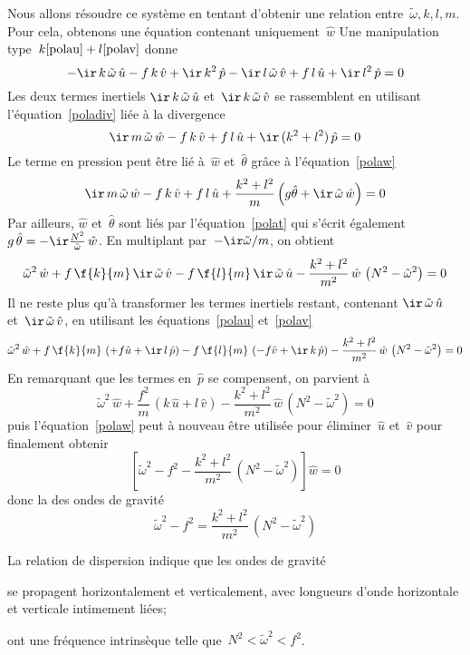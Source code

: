 \sk
Nous allons résoudre ce système 
en tentant d'obtenir une relation entre~$\tilde{\omega},k,l,m$.
Pour cela, obtenons une équation contenant uniquement~$\hat{w}$
Une manipulation type~$k \ref{polau} + l \ref{polav}$ donne
\[
- \ir \, k \, \tilde{\omega} \, \hat{u}
- f \, k \, \hat{v}
+ \ir \, k^2 \, \hat{p} 
- \ir \, l \, \tilde{\omega} \, \hat{v}
+ f \, l \, \hat{u}
+ \ir \, l^2 \, \hat{p} 
= 0
\]
\noindent Les deux termes inertiels $\ir \, k \, \tilde{\omega} \, \hat{u}$ et~$\ir \, k \, \tilde{\omega} \, \hat{v}$ 
se rassemblent en utilisant l'équation~\ref{poladiv} liée à la divergence
\[
\ir \, m \, \tilde{\omega} \, \hat{w}
- f \, k \, \hat{v}
+ f \, l \, \hat{u}
+ \ir \, (k^2 + l^2) \, \hat{p}
= 0
\]
\noindent Le terme en pression peut être lié à~$\hat{w}$ et~$\hat{\theta}$ grâce à l'équation~\ref{polaw}
\[
\ir \, m \, \tilde{\omega} \, \hat{w}
- f \, k \, \hat{v}
+ f \, l \, \hat{u}
+ \frac{k^2 + l^2}{m} \left( g \hat{\theta} + \ir \, \tilde{\omega} \, \hat{w} \right)
= 0
\]
\noindent Par ailleurs, $\hat{w}$ et~$\hat{\theta}$ sont liés par l'équation~\ref{polat} qui s'écrit également $g \, \hat{\theta} = - \ir \frac{N^2}{\tilde{\omega}} \, \hat{w}$. En multiplant par~$- \ir \tilde{\omega} / m$, on obtient
\[
\tilde{\omega}^2 \, \hat{w}
+ f \, \f{k}{m} \, \ir \, \tilde{\omega} \, \hat{v}
- f \, \f{l}{m} \, \ir \, \tilde{\omega} \, \hat{u}
- \frac{k^2 + l^2}{m^2} \, \hat{w} \, \left( N^2 - \tilde{\omega}^2 \right)
= 0
\]
\noindent Il ne reste plus qu'à transformer les termes inertiels restant, contenant $\ir \, \tilde{\omega} \, \hat{u}$ et~$\ir \, \tilde{\omega} \, \hat{v}$, en utilisant les équations~\ref{polau} et~\ref{polav}
\[
\tilde{\omega}^2 \, \hat{w}
+ f \, \f{k}{m} \, \left( + f \hat{u} + \ir \, l \, \hat{p} \right)
- f \, \f{l}{m} \, \left( - f \hat{v} + \ir \, k \, \hat{p} \right) 
- \frac{k^2 + l^2}{m^2} \, \hat{w} \, \left( N^2 - \tilde{\omega}^2 \right)
= 0
\]
\noindent En remarquant que les termes en~$\hat{p}$ se compensent, on parvient à
\[
\tilde{\omega}^2 \, \hat{w}
+ \frac{f^2}{m} \, \left( k \, \hat{u} + l \, \hat{v} \right)
- \frac{k^2 + l^2}{m^2} \, \hat{w} \, \left( N^2 - \tilde{\omega}^2 \right)
= 0
\]
\noindent puis l'équation~\ref{polaw} peut à nouveau être utilisée pour éliminer~$\hat{u}$ et~$\hat{v}$
pour finalement obtenir 
\[
\left[
\tilde{\omega}^2 - f^2
- \frac{k^2 + l^2}{m^2} \, \left( N^2 - \tilde{\omega}^2 \right)
\right] \hat{w}
= 0
\]
\noindent donc la  des ondes de gravité
\[ \boxed{
\tilde{\omega}^2 - f^2 = \frac{k^2 + l^2}{m^2} \, \left( N^2 - \tilde{\omega}^2 \right)
} \]

\sk
La relation de dispersion indique que les ondes de gravité
\begin{finger}
\item se propagent horizontalement et verticalement, avec longueurs d'onde horizontale et verticale intimement liées;
\item ont une fréquence intrinsèque telle que~$N^2 < \tilde{\omega}^2 < f^2$.
\end{finger}

